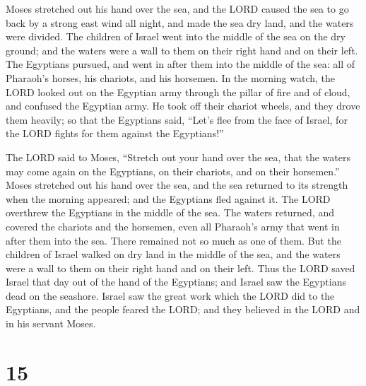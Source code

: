  Moses stretched out his hand over the sea, and the LORD
caused the sea to go back by a strong east wind all night, and made the
sea dry land, and the waters were divided.  The children
of Israel went into the middle of the sea on the dry ground; and the
waters were a wall to them on their right hand and on their left.
 The Egyptians pursued, and went in after them into the
middle of the sea: all of Pharaoh's horses, his chariots, and his
horsemen.  In the morning watch, the LORD looked out on
the Egyptian army through the pillar of fire and of cloud, and confused
the Egyptian army.  He took off their chariot wheels, and
they drove them heavily; so that the Egyptians said, ``Let's flee from
the face of Israel, for the LORD fights for them against the
Egyptians!''

 The LORD said to Moses, ``Stretch out your hand over the
sea, that the waters may come again on the Egyptians, on their chariots,
and on their horsemen.''  Moses stretched out his hand
over the sea, and the sea returned to its strength when the morning
appeared; and the Egyptians fled against it. The LORD overthrew the
Egyptians in the middle of the sea.  The waters returned,
and covered the chariots and the horsemen, even all Pharaoh's army that
went in after them into the sea. There remained not so much as one of
them.  But the children of Israel walked on dry land in
the middle of the sea, and the waters were a wall to them on their right
hand and on their left.  Thus the LORD saved Israel that
day out of the hand of the Egyptians; and Israel saw the Egyptians dead
on the seashore.  Israel saw the great work which the
LORD did to the Egyptians, and the people feared the LORD; and they
believed in the LORD and in his servant Moses.

\hypertarget{section-14}{%
\section{15}\label{section-14}}

